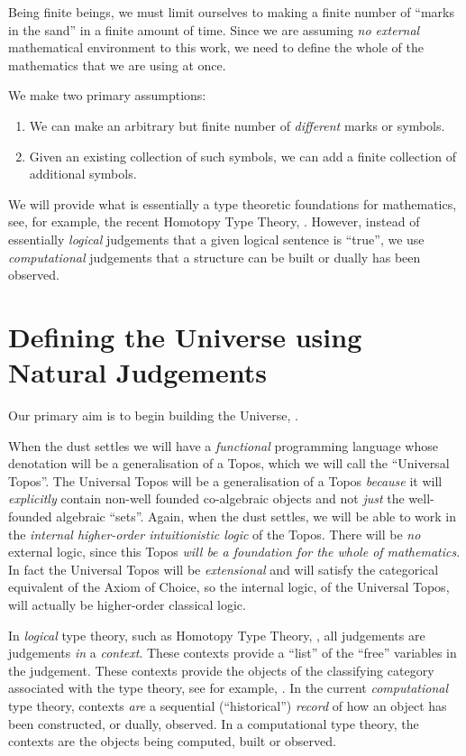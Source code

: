 Being finite beings, we must limit ourselves to making a finite number of
``marks in the sand'' in a finite amount of time. Since we are assuming \emph{no
external} mathematical environment to this work, we need to define the whole of
the mathematics that we are using at once.

We make two primary assumptions:
\begin{enumerate}
\item We can make an arbitrary but finite number of \emph{different} marks or
symbols.
\item Given an existing collection of such symbols, we can add a finite
collection of additional symbols.
\end{enumerate}

We will provide what is essentially a type theoretic foundations for
mathematics, see, for example, the recent Homotopy Type Theory,
\cite{awodeyCoquandVoevodsky2013homotopyTypeTheory}. However, instead of
essentially \emph{logical} judgements that a given logical sentence is ``true'',
we use \emph{computational} judgements that a structure can be built or dually
has been observed.

\section{Defining the Universe using Natural Judgements}

Our primary aim is to begin building the Universe, \Universe{}{}.

When the dust settles we will have a \emph{functional} programming language
whose denotation will be a generalisation of a Topos, which we will call the
``Universal Topos''. The Universal Topos will be a generalisation of a Topos
\emph{because} it will \emph{explicitly} contain non-well founded co-algebraic
objects and not \emph{just} the well-founded algebraic ``sets''. Again, when the
dust settles, we will be able to work in the \emph{internal higher-order
intuitionistic logic} of the Topos. There will be \emph{no} external logic,
since this Topos \emph{will be a foundation for the \emph{whole} of
mathematics}. In fact the Universal Topos will be \emph{extensional} and will
satisfy the categorical equivalent of the Axiom of Choice, so the internal
logic, of the Universal Topos, will actually be higher-order classical logic.

In \emph{logical} type theory, such as Homotopy Type Theory,
\cite{awodeyCoquandVoevodsky2013homotopyTypeTheory}, all judgements are
judgements \emph{in} a \emph{context}. These contexts provide a ``list'' of the
``free'' variables in the judgement. These contexts provide the objects of the
classifying category associated with the type theory, see for example,
\cite{jacobs1999catLogicTypeTh}. In the current \emph{computational} type
theory, contexts \emph{are} a sequential (``historical'') \emph{record} of how
an object has been constructed, or dually, observed. In a computational type
theory, the contexts are the objects being computed, built or observed.

